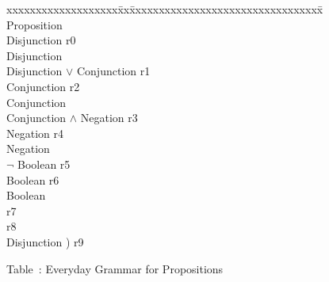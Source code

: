 \begin{samepage}
\begin{em}
\begin{tabbing}
xxxxxxxxxxxxxxxxxxx\=xx\=xxxxxxxxxxxxxxxxxxxxxxxxxxxxxxxxx\=\kill
{}  \>   \\
\>Proposition                                 \\
\> \>Disjunction                      \> r0   \\
\>Disjunction                                 \\
\> \>Disjunction $\vee$ Conjunction   \> r1   \\
\> \>Conjunction                      \> r2   \\
\>Conjunction                                 \\
\> \>Conjunction $\wedge$ Negation    \> r3   \\
\> \>Negation                         \> r4   \\
\>Negation                                    \\
\> \>$\neg$ Boolean                   \> r5   \\
\> \>Boolean                          \> r6   \\
\>Boolean                                     \\
\>                           \> r7   \\
\>                           \> r8   \\
\> \>{\rm(} Disjunction {\rm)}        \> r9 
\end{tabbing}
\end{em}

\begin{center}
Table~\thetable: Everyday Grammar for Propositions
\end{center}
\end{samepage}

